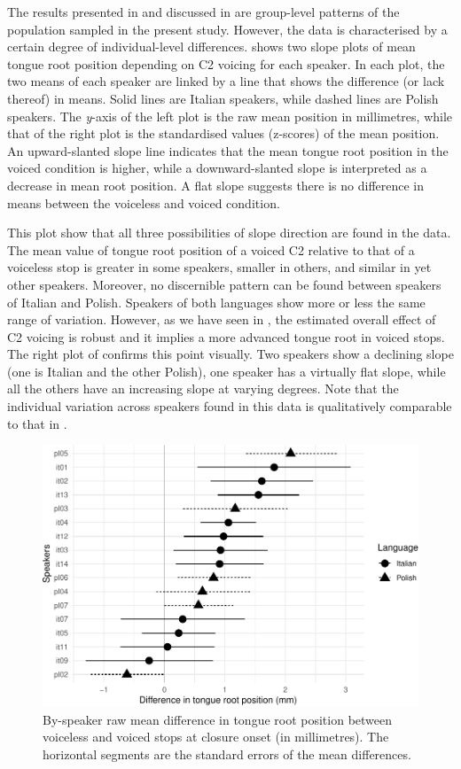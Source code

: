 \documentclass[12pt,]{article}
\begin{document}
The results presented in  and discussed in
 are group-level patterns of the population sampled
in the present study. However, the data is characterised by a certain
degree of individual-level differences.  shows
two slope plots of mean tongue root position depending on C2 voicing for
each speaker. In each plot, the two means of each speaker are linked by
a line that shows the difference (or lack thereof) in means. Solid lines
are Italian speakers, while dashed lines are Polish speakers. The
\emph{y}-axis of the left plot is the raw mean position in millimetres,
while that of the right plot is the standardised values (z-scores) of
the mean position. An upward-slanted slope line indicates that the mean
tongue root position in the voiced condition is higher, while a
downward-slanted slope is interpreted as a decrease in mean root
position. A flat slope suggests there is no difference in means between
the voiceless and voiced condition.

This plot show that all three possibilities of slope direction are found
in the data. The mean value of tongue root position of a voiced C2
relative to that of a voiceless stop is greater in some speakers,
smaller in others, and similar in yet other speakers. Moreover, no
discernible pattern can be found between speakers of Italian and Polish.
Speakers of both languages show more or less the same range of
variation. However, as we have seen in , the estimated
overall effect of C2 voicing is robust and it implies a more advanced
tongue root in voiced stops. The right plot of 
confirms this point visually. Two speakers show a declining slope (one
is Italian and the other Polish), one speaker has a virtually flat
slope, while all the others have an increasing slope at varying degrees.
Note that the individual variation across speakers found in this data is
qualitatively comparable to that in \citet{ahn2018}.

\begin{figure}
\includegraphics[width=\linewidth]{2018-tra_files/figure-latex/trp-difference-1} \caption{By-speaker raw mean difference in tongue root position between voiceless and voiced stops at closure onset (in millimetres). The horizontal segments are the standard errors of the mean differences.}\label{f:trp-difference}
\end{figure}
\end{document}

